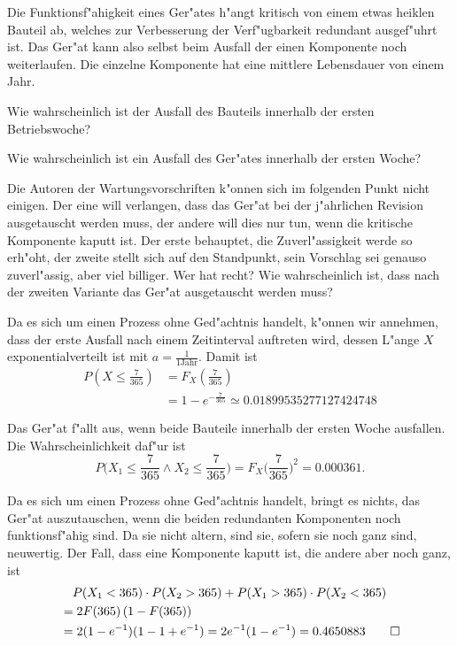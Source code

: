 Die Funktionsf"ahigkeit eines Ger"ates h"angt kritisch von einem etwas
heiklen Bauteil ab, welches zur Verbesserung der Verf"ugbarkeit redundant
ausgef"uhrt ist. Das Ger"at kann also selbst beim Ausfall der einen
Komponente noch weiterlaufen. Die einzelne Komponente hat eine mittlere
Lebensdauer von einem Jahr.
\begin{teilaufgaben}
\item Wie wahrscheinlich ist der Ausfall des Bauteils innerhalb der
ersten Betriebswoche?
\item Wie wahrscheinlich ist ein Ausfall des Ger"ates innerhalb der
ersten Woche?
\item Die Autoren der Wartungsvorschriften k"onnen sich im folgenden Punkt
nicht einigen. Der eine will verlangen, dass das Ger"at bei der j"ahrlichen
Revision ausgetauscht werden muss, der andere will dies nur tun, wenn
die kritische Komponente kaputt ist.
Der erste behauptet, die Zuverl"assigkeit werde so erh"oht, der zweite
stellt sich auf den Standpunkt, sein Vorschlag sei genauso zuverl"assig,
aber viel billiger. Wer hat recht? Wie wahrscheinlich ist, dass nach der
zweiten Variante das Ger"at ausgetauscht werden muss?
\end{teilaufgaben}

\begin{loesung}
\begin{teilaufgaben}
\item Da es sich um einen Prozess ohne Ged"achtnis handelt, k"onnen wir
annehmen, dass der erste Ausfall nach einem Zeitinterval auftreten
wird, dessen L"ange $X$ exponentialverteilt ist mit $a=\frac1{1\text{Jahr}}$.
Damit ist
\begin{align*}
P\left(X\le \frac{7}{365}\right)
&=
F_X\left(\frac{7}{365}\right)\\
&=
1-e^{-\frac{7}{365}}
\simeq
0.01899535277127424748
\end{align*}
\item
Das Ger"at f"allt aus, wenn beide Bauteile innerhalb der ersten
Woche ausfallen. Die Wahrscheinlichkeit daf"ur ist
\[
P\biggl(X_1\le \frac{7}{365}\wedge X_2\le \frac{7}{365}\biggr)
=F_X\biggl(\frac{7}{365}\biggr)^2=0.000361.
\]
\item
Da es sich um einen Prozess ohne Ged"achtnis handelt, bringt es
nichts, das Ger"at auszutauschen, wenn die beiden redundanten Komponenten
noch funktionsf"ahig sind. Da sie nicht altern, sind sie, sofern sie
noch ganz sind, neuwertig.
Der Fall, dass eine Komponente kaputt ist, die andere aber noch ganz,
ist
\begin{align*}
&\quad P(X_1 < 365)\cdot P(X_2>365)
+P(X_1 > 365)\cdot P(X_2<365)
\\
&=
2F(365)\,(1-F(365))
\\
&=
2(1-e^{-1})(1-1+e^{-1})=2e^{-1}(1-e^{-1})=0.4650883
\qedhere
\end{align*}
\end{teilaufgaben}
\end{loesung}

